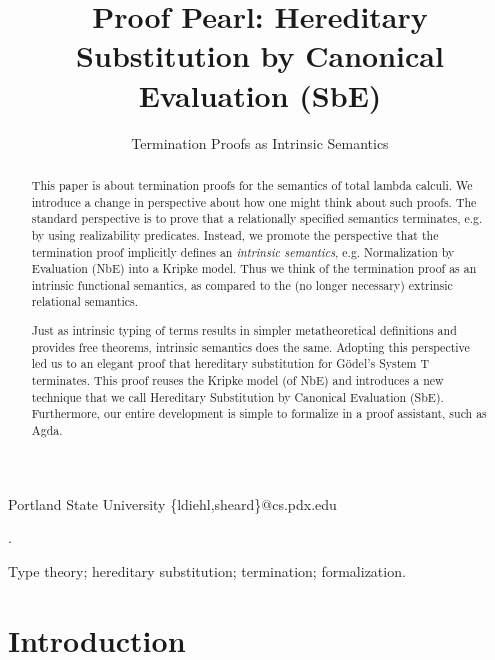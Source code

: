 \documentclass[preprint,nonatbib]{sigplanconf}
\numberwithin{subdefin}{defin}
\theoremstyle{definition}
\numberwithin{subtheorem}{theorem}
\numberwithin{sublemma}{theorem}
\numberwithin{corollary}{theorem}
\numberwithin{case}{theorem}
\numberwithin{slcase}{sublemma}
\numberwithin{scase}{subtheorem}
\numberwithin{lcase}{lemma}
\begin{document}
\setlength{\pdfpageheight}{\paperheight}
\setlength{\pdfpagewidth}{\paperwidth}


\title{Proof Pearl: Hereditary Substitution by Canonical Evaluation (SbE)}
\subtitle{Termination Proofs as Intrinsic Semantics}

           {Portland State University}
           {\{ldiehl,sheard\}@cs.pdx.edu}

\maketitle

\begin{abstract}

This paper is about termination proofs for the semantics of total lambda calculi.
We introduce a change in perspective about how one might
think about such proofs. The standard perspective is to prove that a relationally
specified semantics terminates, e.g. by using realizability predicates. Instead,
we promote the perspective that the termination proof implicitly defines
an {\it intrinsic semantics}, e.g. Normalization by Evaluation (NbE) into a Kripke model.
Thus we think of the termination proof as an intrinsic functional semantics, as compared
to the (no longer necessary) extrinsic relational semantics.

Just as intrinsic typing of terms results in simpler metatheoretical definitions and provides
free theorems, intrinsic semantics does the same. Adopting this perspective
led us to an elegant proof
that hereditary substitution for G{\"o}del's System T terminates. This proof
reuses the Kripke model (of NbE) and introduces a new technique that we call
Hereditary Substitution by Canonical Evaluation (SbE). Furthermore,
our entire development is simple to formalize in a proof assistant, such as Agda.
\end{abstract}

.

\keywords
Type theory; hereditary substitution; termination; formalization.

\section{Introduction}
\label{sec:intro}
\end{document}
